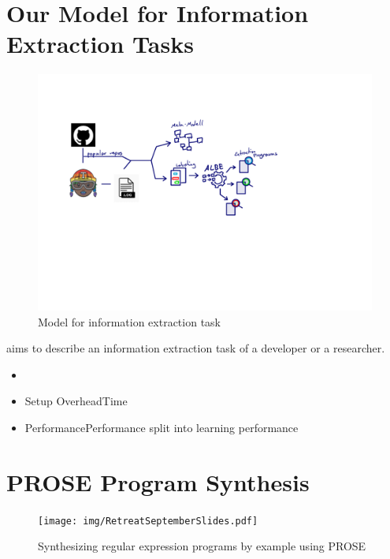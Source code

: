 \documentclass[\myrootdir/main.tex]{subfiles}
\begin{document}
\section{Our Model for Information Extraction Tasks}
\begin{figure}[h]
	\centering
	\includegraphics[page=4, width=\textwidth, trim={0.5cm 0.5cm 0.5cm 0.5cm}, clip]{img/flow-of-research.pdf}
	\caption{Model for information extraction task}
	\label{fig:modelt-ie-task}
\end{figure}
aims to describe an information extraction task of a developer or a researcher.
\begin{itemize}
	\item {}
	\item{Setup Overhead}{Time}
	\item{Performance}{Performance} split into learning performance
\end{itemize}


\section{PROSE Program Synthesis}
\begin{figure}[h]
  \centering
\texttt{[image: img/RetreatSeptemberSlides.pdf]}
  \caption{Synthesizing regular expression programs by example using PROSE}
  \label{fig:prose-explanation}
\end{figure}
\end{document}
